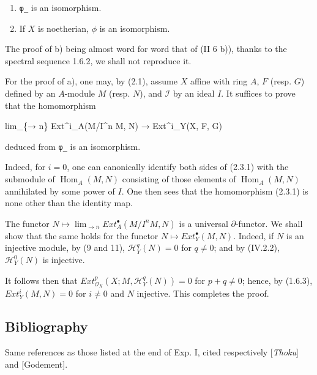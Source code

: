 \documentclass[
]{article}
\newenvironment{Shaded}{}{}
\newcommand{\NormalTok}[1]{#1}
\begin{document}
\begin{enumerate}
\def\labelenumi{\alph{enumi})}
\item
  \texttt{φ̲} is an isomorphism.
\item
  If \(X\) is noetherian, \(\phi\) is an isomorphism.
\end{enumerate}

The proof of b) being almost word for word that of (II 6 b)), thanks to
the spectral sequence 1.6.2, we shall not reproduce it.

For the proof of a), one may, by (2.1), assume \(X\) affine with ring
\(A\), \(F\) (resp. \(G\)) defined by an \(A\)-module \(M\) (resp.
\(N\)), and \(\mathcal{I}\) by an ideal \(I\). It suffices to prove that
the homomorphism

\begin{Shaded}
\begin{Highlighting}[]
\NormalTok{lim\_\{→ n\} Ext\^{}i\_A(M/I\^{}n M, N) → Ext\^{}i\_Y(X, F, G)}
\end{Highlighting}
\end{Shaded}

deduced from \texttt{φ̲} is an isomorphism.

Indeed, for \(i = 0\), one can canonically identify both sides of
(2.3.1) with the submodule of \(\operatorname{Hom}_{A}(M, N)\)
consisting of those elements of \(\operatorname{Hom}_{A}(M, N)\)
annihilated by some power of \(I\). One then sees that the homomorphism
(2.3.1) is none other than the identity map.

The functor \(N \mapsto \lim_{\to n} Ext^{\bullet}_{A}(M/I^{n} M, N)\)
is a universal \(\partial\)-functor. We shall show that the same holds
for the functor \(N \mapsto Ext^{\bullet}_{Y}(M, N)\). Indeed, if \(N\)
is an injective module, by (9 and 11), \(\mathcal{H}^{q}_{Y}(N) = 0\)
for \(q \neq 0\); and by (IV.2.2), \(\mathcal{H}^{0}_{Y}(N)\) is
injective.

It follows then that
\(Ext^{p}_{\mathcal{O}_{X}}(X; M, \mathcal{H}^{q}_{Y}(N)) = 0\) for
\(p + q \neq 0\); hence, by (1.6.3), \(Ext^{i}_{Y}(M, N) = 0\) for
\(i \neq 0\) and \(N\) injective. This completes the proof.

\subsection{Bibliography}\label{bibliography-1}

Same references as those listed at the end of Exp. I, cited respectively
{[}\emph{Thoku}{]} and {[}Godement{]}.
\end{document}
